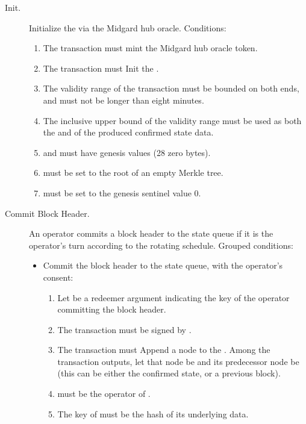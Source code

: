 \documentclass[../midgard.tex]{subfiles}
\begin{document}
\begin{description}
    \item[Init.] Initialize the  via the Midgard hub oracle.
      Conditions:
        \begin{enumerate}
            \item The transaction must mint the Midgard hub oracle token.
            \item The transaction must Init the .
            \item The validity range of the transaction must be bounded on both ends, and must not be longer than eight minutes.
            \item The inclusive upper bound of the validity range must be used as both the  and  of the produced confirmed state data.
            \item {} and  must have genesis values (28 zero bytes).
            \item {} must be set to the root of an empty Merkle tree.
            \item {} must be set to the genesis sentinel value \(0\).
        \end{enumerate}

    \item[Commit Block Header.] An operator commits a block header to the state queue if it is the operator's turn according to the rotating schedule.
      Grouped conditions:
        \begin{itemize}
            \item Commit the block header to the state queue, with the operator's consent:
            \begin{enumerate}
                \item Let  be a redeemer argument indicating the key of the operator committing the block header.
                \item The transaction must be signed by .
                \item The transaction must Append a node to the .
                  Among the transaction outputs, let that node be  and its predecessor node be  (this can be either the confirmed state, or a previous block).
                \item {} must be the operator of .
                \item The key of  must be the hash of its underlying  data.
            \end{enumerate}


\end{itemize}
\end{description}
\end{document}
